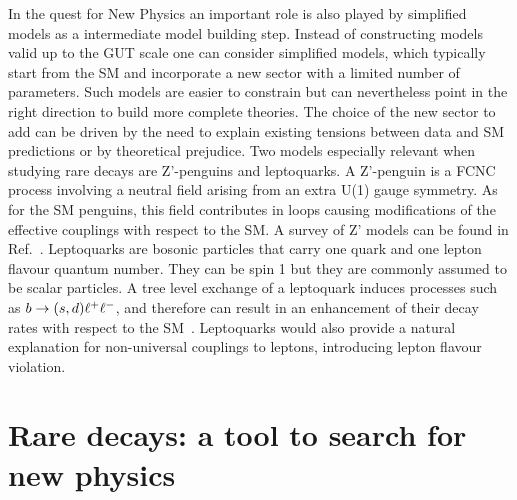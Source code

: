 In the quest for New Physics an important role is also played by simplified models
as a intermediate model building step. Instead of constructing models valid up to the GUT scale
one can consider simplified models, which typically  start from the  SM and incorporate a new sector
with a limited number of parameters. Such models are easier to constrain but can nevertheless point
in the right direction to build more complete theories. The choice of the new sector to add can be driven by the need to
explain existing tensions between data and SM predictions or by theoretical prejudice.
%
Two models especially relevant when studying rare decays are Z'-penguins and leptoquarks.
A Z'-penguin is a FCNC process involving a neutral field arising from an extra U(1) gauge symmetry.
As for the SM penguins, this field contributes in loops causing modifications of the effective couplings
with respect to the SM. A survey of Z' models can be found in Ref.~\cite{Buras:2014zga}.
%
Leptoquarks are bosonic particles that carry one quark and one lepton flavour quantum number.
They can be spin 1 but they are commonly assumed to be scalar particles.
A tree level exchange of a leptoquark induces processes such as $b \rightarrow (s,d)\ell^+\ell^-$,
and therefore can result in an enhancement of their decay rates with respect to the SM~\cite{Hiller:2014yaa}.
Leptoquarks would also provide a natural explanation for non-universal couplings to leptons,
introducing lepton flavour violation.


\section{Rare decays: a tool to search for new physics}

